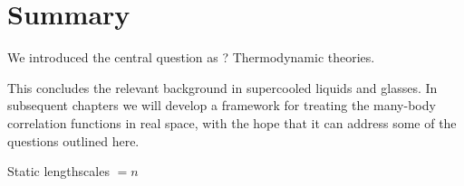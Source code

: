 \documentclass[11pt,twoside]{report}
\def\includebibliography{}
\begin{document}

\section{Summary}

We introduced the central question as ?
Thermodynamic theories.

This concludes the relevant background in supercooled liquids and glasses.
In subsequent chapters we will develop a framework for treating the many-body correlation functions in real space, with the hope that it can address some of the questions outlined here.

Static lengthscales $=n$

\ifdefined\includebibliography
  \printbibliography
\fi
\end{document}
